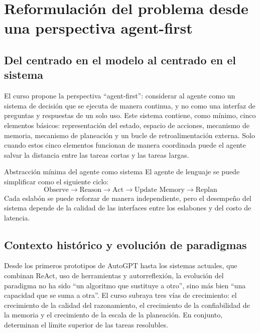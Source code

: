 \section{Reformulación del problema desde una perspectiva agent-first}

\subsection{Del centrado en el modelo al centrado en el sistema}

El curso propone la perspectiva ``agent-first'': considerar al agente como un sistema de decisión que se ejecuta de manera continua, y no como una interfaz de preguntas y respuestas de un solo uso. Este sistema contiene, como mínimo, cinco elementos básicos: representación del estado, espacio de acciones, mecanismo de memoria, mecanismo de planeación y un bucle de retroalimentación externa. Solo cuando estos cinco elementos funcionan de manera coordinada puede el agente salvar la distancia entre las tareas cortas y las tareas largas.

\begin{knowledgebox}{Abstracción mínima del agente como sistema}
El agente de lenguaje se puede simplificar como el siguiente ciclo:
\[
\text{Observe} \rightarrow \text{Reason} \rightarrow \text{Act} \rightarrow \text{Update Memory} \rightarrow \text{Replan}
\]
Cada eslabón se puede reforzar de manera independiente, pero el desempeño del sistema depende de la calidad de las interfaces entre los eslabones y del costo de latencia.
\end{knowledgebox}

\subsection{Contexto histórico y evolución de paradigmas}

Desde los primeros prototipos de AutoGPT hasta los sistemas actuales, que combinan ReAct, uso de herramientas y autorreflexión, la evolución del paradigma no ha sido ``un algoritmo que sustituye a otro'', sino más bien ``una capacidad que se suma a otra''. El curso subraya tres vías de crecimiento: el crecimiento de la calidad del razonamiento, el crecimiento de la confiabilidad de la memoria y el crecimiento de la escala de la planeación. En conjunto, determinan el límite superior de las tareas resolubles.

